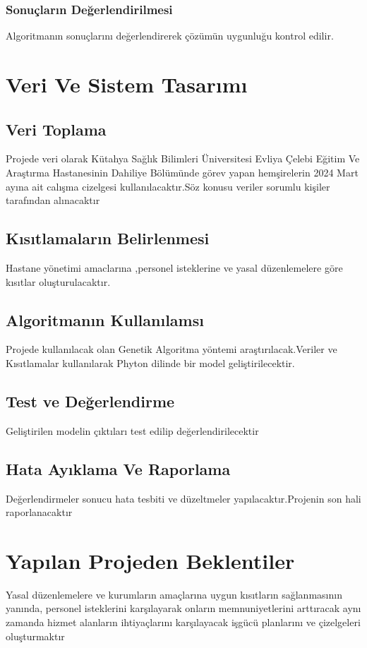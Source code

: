 \documentclass[12pt, a4paper]{article}
\begin{document}
\begin{flushleft}
		\subsubsection{Sonuçların Değerlendirilmesi}
		Algoritmanın sonuçlarını değerlendirerek çözümün uygunluğu kontrol edilir.\\[30pt]
	
	
	\section{ Veri Ve Sistem Tasarımı}
    	\subsection{Veri Toplama}
    	Projede veri olarak \cite{evliyacelebieah.saglik.gov.tr} Kütahya Sağlık Bilimleri Üniversitesi Evliya Çelebi Eğitim Ve Araştırma Hastanesinin Dahiliye Bölümünde görev yapan hemşirelerin 2024 Mart ayına ait calışma cizelgesi kullanılacaktır.Söz konusu veriler sorumlu kişiler tarafından alınacaktır	\\[10pt]
	
    	\subsection{Kısıtlamaların Belirlenmesi}
    	Hastane yönetimi amaclarına ,personel isteklerine  ve yasal düzenlemelere göre kısıtlar oluşturulacaktır.\\[10pt]
	    \subsection{Algoritmanın Kullanılamsı}
    	Projede kullanılacak olan Genetik Algoritma yöntemi araştırılacak.Veriler ve Kısıtlamalar kullanılarak Phyton dilinde bir model geliştirilecektir. \\[10pt] 
    	\subsection{Test ve Değerlendirme}
    	Geliştirilen modelin çıktıları test edilip değerlendirilecektir \\[10pt] 
	    \subsection{Hata Ayıklama Ve Raporlama}
	    Değerlendirmeler sonucu hata tesbiti ve düzeltmeler yapılacaktır.Projenin son hali raporlanacaktır	\\[10pt] 
	
	\section{Yapılan Projeden Beklentiler} 
	   Yasal düzenlemelere ve kurumların amaçlarına uygun kısıtların sağlanmasının yanında, personel isteklerini karşılayarak onların memnuniyetlerini arttıracak aynı zamanda hizmet alanların ihtiyaçlarını karşılayacak işgücü planlarını ve çizelgeleri oluşturmaktır
	
	
	 
	\end{flushleft}
\end{document}
